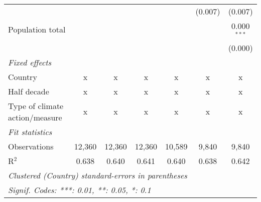 \begin{tabular}{lcccccc}
                                                                                     &             &               &               &               & (0.007)       & (0.007)\\   
   Population total                                                                  &             &               &               &               &               & 0.000$^{***}$\\   
                                                                                     &             &               &               &               &               & (0.000)\\   
   \emph{Fixed effects}\\
   Country                                                                           & x           & x             & x             & x             & x             & x\\  
   Half decade                                                                       & x           & x             & x             & x             & x             & x\\  
   Type of climate action/measure                                                    & x           & x             & x             & x             & x             & x\\  
   \midrule \emph{Fit statistics}\\
   Observations                                                                      & 12,360      & 12,360        & 12,360        & 10,589        & 9,840         & 9,840\\  
   R$^2$                                                                             & 0.638       & 0.640         & 0.641         & 0.640         & 0.638         & 0.642\\  
   \midrule
   \multicolumn{7}{l}{\emph{Clustered (Country) standard-errors in parentheses}}\\
   \multicolumn{7}{l}{\emph{Signif. Codes: ***: 0.01, **: 0.05, *: 0.1}}\\
\end{tabular}
\par\endgroup


